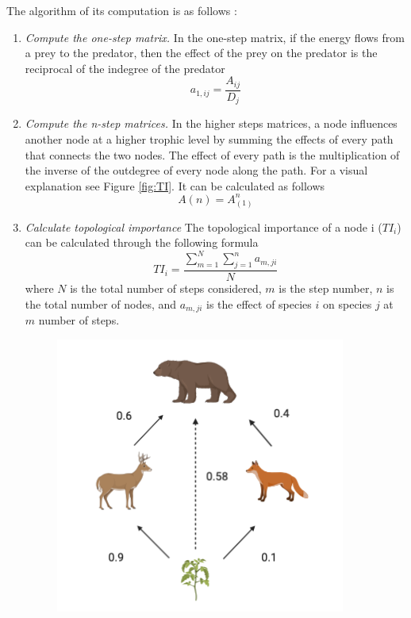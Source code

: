 \documentclass[twocolumn]{article}
\begin{document}
		The algorithm of its computation is as follows \citep{Jordan2009}: \begin{enumerate} \item \emph{Compute the one-step matrix.
			      } \smallskip \newline
			      In the one-step matrix, if the energy flows from a prey to the predator, then the effect of the prey on the predator is the reciprocal of the indegree of the predator
			      \begin{equation}
				      a_{1,ij}=\frac{A_{ij}}{D_j}
			      \end{equation}
			\item \emph{Compute the n-step matrices.} \smallskip \newline
			      In the higher steps matrices, a node influences another node at a higher trophic level by summing the effects of every path that connects the two nodes.
			      The effect of every path is the multiplication of the inverse of the outdegree of every node along the path.
			      For a visual explanation see Figure \ref{fig:TI}.
			      It can be calculated as follows
			      \begin{equation}
				      A\left(n\right)=A_{\left(1\right)}^n
			      \end{equation}
			\item \emph{Calculate topological importance} \smallskip \newline The topological importance of a node i ($TI_i$) can be calculated through the following formula
			      \begin{equation}
				      TI_i=\frac{\sum\limits^N_{m=1}\sum\limits^n_{j=1}a_{m,ji}}{N}
			      \end{equation}
			      where $N$ is the total number of steps considered, $m$ is the step number,  $n$ is the total number of nodes, and $a_{m,ji}$ is the effect of species $i$ on species $j$ at $m$ number of steps.
			      \begin{figure}[htbp]%
				      \centering
				      \includegraphics[width=.8\linewidth]{TI_example.png}

\end{figure}
\end{enumerate}
\end{document}
